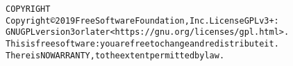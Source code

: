 \begin{alltt}
COPYRIGHT
       Copyright \copyright 2019 Free Software Foundation, Inc.  License GPLv3+:
	GNU GPL version 3 or later <https://gnu.org/licenses/gpl.html>.
       This is free software: you are free to change and redistribute it.
	There is NO WARRANTY, to the extent permitted by law.

\end{alltt}
